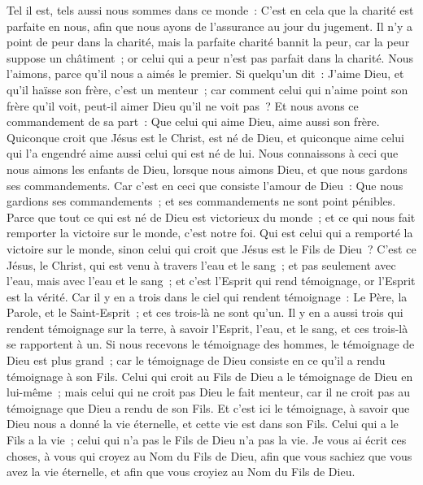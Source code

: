 \begin{multicols}{2}
Tel il est, tels aussi nous sommes dans ce monde~: C'est en cela que la charité est parfaite en nous, afin que nous ayons de l'assurance au jour du jugement.
Il n'y a point de peur dans la charité, mais la parfaite charité bannit la peur, car la peur suppose un châtiment~; or celui qui a peur n'est pas parfait dans la charité.
Nous l'aimons, parce qu'il nous a aimés le premier.
Si quelqu'un dit~: J'aime Dieu, et qu'il haïsse son frère, c'est un menteur~; car comment celui qui n'aime point son frère qu'il voit, peut-il aimer Dieu qu'il ne voit pas~?
Et nous avons ce commandement de sa part~: Que celui qui aime Dieu, aime aussi son frère.
\VerseOne{}Quiconque croit que Jésus est le Christ, est né de Dieu, et quiconque aime celui qui l'a engendré aime aussi celui qui est né de lui.
Nous connaissons à ceci que nous aimons les enfants de Dieu, lorsque nous aimons Dieu, et que nous gardons ses commandements.
Car c'est en ceci que consiste l'amour de Dieu~: Que nous gardions ses commandements~; et ses commandements ne sont point pénibles.
Parce que tout ce qui est né de Dieu est victorieux du monde~; et ce qui nous fait remporter la victoire sur le monde, c'est notre foi.
Qui est celui qui a remporté la victoire sur le monde, sinon celui qui croit que Jésus est le Fils de Dieu~?
C'est ce Jésus, le Christ, qui est venu à travers l'eau et le sang~; et pas seulement avec l'eau, mais avec l'eau et le sang~; et c'est l'Esprit qui rend témoignage, or l'Esprit est la vérité.
Car il y en a trois dans le ciel qui rendent témoignage~: Le Père, la Parole, et le Saint-Esprit~; et ces trois-là ne sont qu'un.
Il y en a aussi trois qui rendent témoignage sur la terre, à savoir l'Esprit, l'eau, et le sang, et ces trois-là se rapportent à un.
Si nous recevons le témoignage des hommes, le témoignage de Dieu est plus grand~; car le témoignage de Dieu consiste en ce qu'il a rendu témoignage à son Fils.
Celui qui croit au Fils de Dieu a le témoignage de Dieu en lui-même~; mais celui qui ne croit pas Dieu le fait menteur, car il ne croit pas au témoignage que Dieu a rendu de son Fils.
Et c'est ici le témoignage, à savoir que Dieu nous a donné la vie éternelle, et cette vie est dans son Fils.
Celui qui a le Fils a la vie~; celui qui n'a pas le Fils de Dieu n'a pas la vie.
Je vous ai écrit ces choses, à vous qui croyez au Nom du Fils de Dieu, afin que vous sachiez que vous avez la vie éternelle, et afin que vous croyiez au Nom du Fils de Dieu.

\end{multicols}
